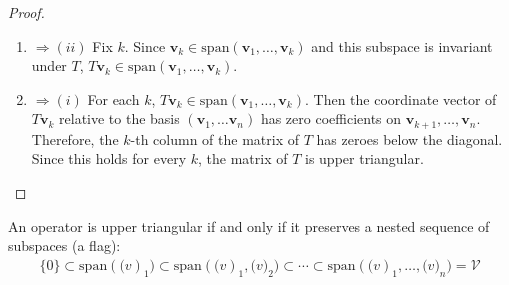 \begin{proposition}
\begin{proof}
\begin{enumerate}[label=\roman*.]
\item[$(iii)$]$\Rightarrow (ii)$ Fix $k$. Since $\mathbf{v}_k \in \text{span}(\mathbf{v}_1, \ldots, \mathbf{v}_k)$ and this subspace is invariant under $T$, $T\mathbf{v}_k \in \text{span}(\mathbf{v}_1, \ldots, \mathbf{v}_k)$.
\item[$(ii)$]$\Rightarrow (i)$ For each $k$, $T \mathbf{v}_k \in \text{span}(\mathbf{v}_1, \ldots, \mathbf{v}_k)$. Then the coordinate vector of $T \mathbf{v}_k$ relative to the basis $(\mathbf{v}_1, \ldots \mathbf{v}_n)$ has zero coefficients on $\mathbf{v}_{k+1}, \ldots, \mathbf{v}_n$. Therefore, the $k$-th column of the matrix of $T$ has zeroes below the diagonal. Since this holds for every $k$, the matrix of $T$ is upper triangular.
\end{enumerate}
\end{proof}
\end{proposition}

An operator is upper triangular if and only if it preserves a nested sequence of subspaces (a flag):
\begin{align}
\{ 0 \} \subset \text{span}(\mathbf(v)_1) \subset \text{span}(\mathbf(v)_1, \mathbf(v)_2) \subset \cdots \subset \text{span}(\mathbf(v)_1, \ldots, \mathbf(v)_n) = \mathcal{V} \nonumber
\end{align}

